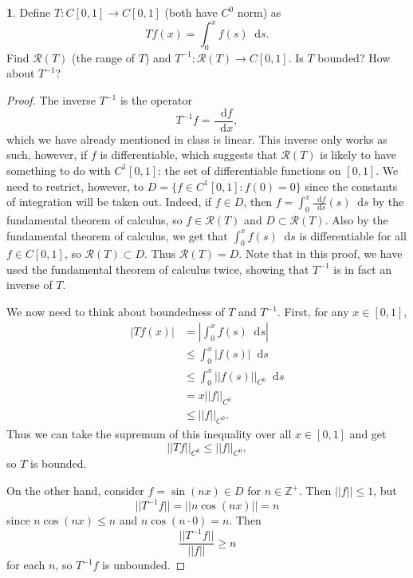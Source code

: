 \documentclass[12pt]{article}
\newcommand{\dd}{\mathop{}\!\mathrm{d}}
\theoremstyle{definition}
\newtheorem{ex}{}
\begin{document}
\begin{ex}
	Define $T : C[0, 1] \to C[0, 1]$ (both have $C^0$ norm) as \begin{equation*}
		Tf(x) = \int_0^x f(s) \dd s.
	\end{equation*}
	Find $\mathcal{R}(T)$ (the range of $T$) and $T^{-1} : \mathcal{R}(T) \to C[0, 1]$.
	Is $T$ bounded?
	How about $T^{-1}$?
\end{ex}
\begin{proof}
	The inverse $T^{-1}$ is the operator \begin{equation*}
		T^{-1}f = \frac{\dd f}{\dd x},
	\end{equation*}
	which we have already mentioned in class is linear.
	This inverse only works as such, however, if $f$ is differentiable, which suggests that $\mathcal{R}(T)$ is likely to have something to do with $C^1[0, 1]$: the set of differentiable functions on $[0, 1]$.
	We need to restrict, however, to $D = \lbrace f \in C^1[0, 1] : f(0) = 0 \rbrace$ since the constants of integration will be taken out.
	Indeed, if $f \in D$, then $f = \int_0^x \frac{\dd f}{\dd s}(s) \dd s$ by the fundamental theorem of calculus, so $f \in \mathcal{R}(T)$ and $D \subset \mathcal{R}(T)$.
	Also by the fundamental theorem of calculus, we get that $\int_0^x f(s) \dd s$ is differentiable for all $f \in C[0, 1]$, so $\mathcal{R}(T) \subset D$.
	Thus $\mathcal{R}(T) = D$.
	Note that in this proof, we have used the fundamental theorem of calculus twice, showing that $T^{-1}$ is in fact an inverse of $T$.

	We now need to think about boundedness of $T$ and $T^{-1}$.
	First, for any $x \in [0, 1]$, \begin{align*}
		|Tf(x)| & = \left| \int_0^x f(s) \dd s \right| \\
		        & \leq \int_0^x |f(s)| \dd s           \\
		        & \leq \int_0^x ||f(s)||_{C^0} \dd s   \\
		        & = x ||f||_{C^0}                      \\
		        & \leq ||f||_{C^0}.
	\end{align*}
	Thus we can take the supremum of this inequality over all $x \in [0, 1]$ and get \begin{equation*}
		||Tf||_{C^0} \leq ||f||_{C^0},
	\end{equation*}
	so $T$ is bounded.

	On the other hand, consider $f = \sin(nx) \in D$ for $n \in \mathbb{Z}^+$.
  Then $||f|| \leq 1$, but \begin{equation*}
    ||T^{-1}f|| = ||n\cos(nx)|| = n
  \end{equation*}
  since $n\cos(nx) \leq n$ and $n\cos(n\cdot 0) = n$.
  Then \begin{equation*}
    \frac{||T^{-1}f||}{||f||} \geq n
  \end{equation*}
  for each $n$, so $T^{-1}f$ is unbounded.
\end{proof}
\end{document}
